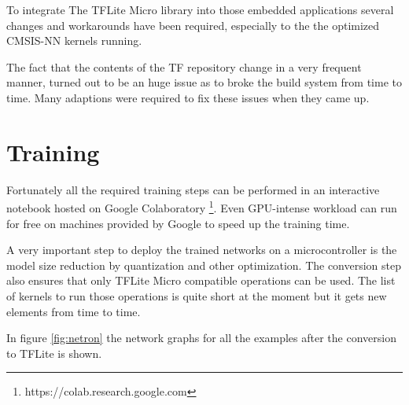 \documentclass[oneside]{tum-book}
\begin{document}
To integrate The TFLite Micro library into those embedded applications several changes and workarounds have been required, especially to the the optimized CMSIS-NN kernels running.

The fact that the contents of the TF repository change in a very frequent manner, turned out to be an huge issue as to broke the build system from time to time. Many adaptions were required to fix these issues when they came up.

\section{Training}

Fortunately all the required training steps can be performed in an interactive notebook hosted on Google Colaboratory \footnote{https://colab.research.google.com}. Even GPU-intense workload can run for free on machines provided by Google to speed up the training time.

A very important step to deploy the trained networks on a microcontroller is the model size reduction by quantization and other optimization. The conversion step also ensures that only TFLite Micro compatible operations can be used. The list of kernels to run those operations is quite short at the moment but it gets new elements from time to time.

In figure \ref{fig:netron} the network graphs for all the examples after the conversion to TFLite is shown.
\end{document}
